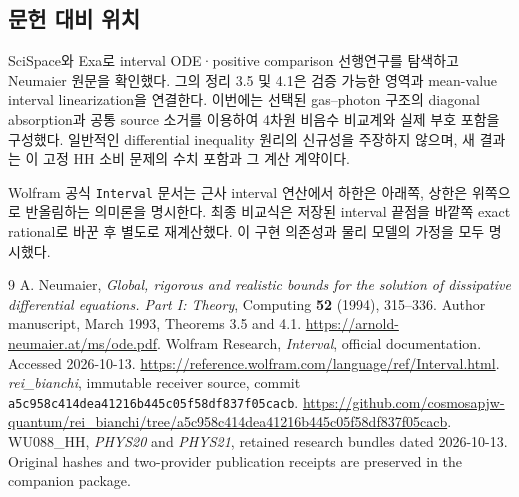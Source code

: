 \documentclass[11pt,a4paper]{article}
\numberwithin{equation}{section}
\begin{document}
\subsection*{문헌 대비 위치}
SciSpace와 Exa로 interval ODE·positive comparison 선행연구를 탐색하고 Neumaier 원문을 확인했다. 그의 정리 3.5 및 4.1은 검증 가능한 영역과 mean-value interval linearization을 연결한다. 이번에는 선택된 gas--photon 구조의 diagonal absorption과 공통 source 소거를 이용하여 4차원 비음수 비교계와 실제 부호 포함을 구성했다. 일반적인 differential inequality 원리의 신규성을 주장하지 않으며, 새 결과는 이 고정 HH 소비 문제의 수치 포함과 그 계산 계약이다.

Wolfram 공식 \texttt{Interval} 문서는 근사 interval 연산에서 하한은 아래쪽, 상한은 위쪽으로 반올림하는 의미론을 명시한다. 최종 비교식은 저장된 interval 끝점을 바깥쪽 exact rational로 바꾼 후 별도로 재계산했다. 이 구현 의존성과 물리 모델의 가정을 모두 명시했다.

\begin{thebibliography}{9}\small
{} A. Neumaier, \emph{Global, rigorous and realistic bounds for the solution of dissipative differential equations. Part I: Theory}, Computing \textbf{52} (1994), 315--336. Author manuscript, March 1993, Theorems 3.5 and 4.1. \url{https://arnold-neumaier.at/ms/ode.pdf}.
 Wolfram Research, \emph{Interval}, official documentation. Accessed 2026-10-13. \url{https://reference.wolfram.com/language/ref/Interval.html}.
 \emph{rei\_bianchi}, immutable receiver source, commit \texttt{a5c958c414dea41216b445c05f58df837f05cacb}. \url{https://github.com/cosmosapjw-quantum/rei_bianchi/tree/a5c958c414dea41216b445c05f58df837f05cacb}.
 WU088\_HH, \emph{PHYS20} and \emph{PHYS21}, retained research bundles dated 2026-10-13. Original hashes and two-provider publication receipts are preserved in the companion package.
\end{thebibliography}
\end{document}
